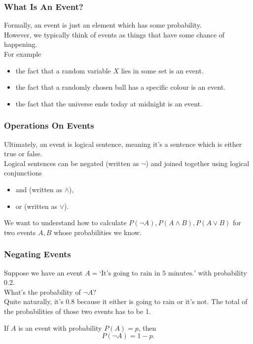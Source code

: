 \documentclass[aspectratio=169,11pt,usenames,dvipsnames,handout]{beamer}
\begin{document}
\begin{frame}
 \frametitle{What Is An Event?}
 Formally, an \alert{event} is just an element which \alert{has some
 probability}.\\
 However, we typically think of events as \alert{things that have some chance of
 happening}.\\
 For example
 \begin{itemize}
  \item the fact that a random variable $X$ lies in some set is an event.
  \pause
  \item the fact that a randomly chosen ball has a specific colour is an event.
  \pause
  \item the fact that the universe ends today at midnight is an event.
 \end{itemize}
\end{frame}

\begin{frame}
 \frametitle{Operations On Events}
 Ultimately, an event is \alert{logical sentence}, meaning it's a sentence which
 is either \alert{true} or \alert{false}.\pause\\
 Logical sentences can be negated (written as $\neg $) and joined together using
 logical conjunctions\pause\\
 \begin{itemize}
  \item \alert{and} (written as $ \wedge $),
  \pause
  \item \alert{or} (written as $ \vee $).
 \end{itemize}
 \pause
 We want to understand how to calculate $P(\neg A),P(A \wedge B),P(A \vee B)$
 for two events $A,B$ whose probabilities we know.
\end{frame}

\begin{frame}
 \frametitle{Negating Events}
 Suppose we have an event $A = \text{`It's going to rain in 5 minutes.'}$ with
 probability 0.2.\pause\\
 What's the probability of $\neg A$?\pause\\
 Quite naturally, it's 0.8 because it either is going to rain or it's not. The
 total of the probabilities of those two events has to be 1.\pause
 \begin{tcolorbox}[title=Negation Formula]
  If $A$ is an event with probability $P(A) = p$, then
  \[
   P(\neg A) = 1 - p.
  \]
 \end{tcolorbox}
\end{frame}
\end{document}
